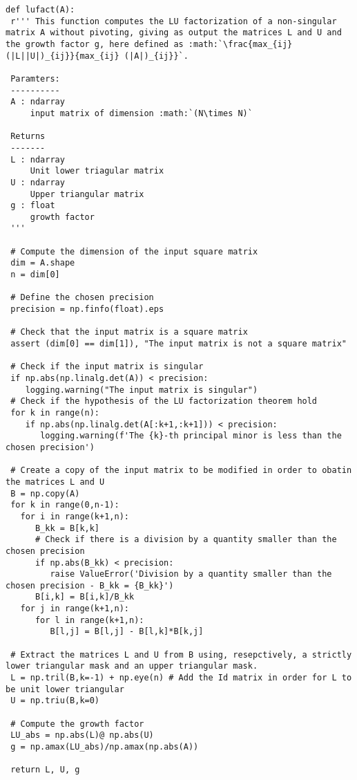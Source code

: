 \documentclass[a4paper,11pt]{report}
\begin{document}
\begin{verbatim}
def lufact(A):
 r''' This function computes the LU factorization of a non-singular matrix A without pivoting, giving as output the matrices L and U and the growth factor g, here defined as :math:`\frac{max_{ij} (|L||U|)_{ij}}{max_{ij} (|A|)_{ij}}`.

 Paramters:
 ----------
 A : ndarray
     input matrix of dimension :math:`(N\times N)`
	
 Returns
 -------
 L : ndarray
     Unit lower triagular matrix
 U : ndarray
     Upper triangular matrix
 g : float
     growth factor
 '''

 # Compute the dimension of the input square matrix
 dim = A.shape
 n = dim[0]

 # Define the chosen precision
 precision = np.finfo(float).eps

 # Check that the input matrix is a square matrix
 assert (dim[0] == dim[1]), "The input matrix is not a square matrix"

 # Check if the input matrix is singular
 if np.abs(np.linalg.det(A)) < precision:
    logging.warning("The input matrix is singular")
 # Check if the hypothesis of the LU factorization theorem hold
 for k in range(n):
    if np.abs(np.linalg.det(A[:k+1,:k+1])) < precision:
       logging.warning(f'The {k}-th principal minor is less than the chosen precision')

 # Create a copy of the input matrix to be modified in order to obatin the matrices L and U
 B = np.copy(A)
 for k in range(0,n-1):
   for i in range(k+1,n):
      B_kk = B[k,k]
      # Check if there is a division by a quantity smaller than the chosen precision
      if np.abs(B_kk) < precision:
         raise ValueError('Division by a quantity smaller than the chosen precision - B_kk = {B_kk}')
      B[i,k] = B[i,k]/B_kk
   for j in range(k+1,n):
      for l in range(k+1,n):
         B[l,j] = B[l,j] - B[l,k]*B[k,j]

 # Extract the matrices L and U from B using, resepctively, a strictly lower triangular mask and an upper triangular mask.
 L = np.tril(B,k=-1) + np.eye(n) # Add the Id matrix in order for L to be unit lower triangular
 U = np.triu(B,k=0)  

 # Compute the growth factor
 LU_abs = np.abs(L)@ np.abs(U)
 g = np.amax(LU_abs)/np.amax(np.abs(A))

 return L, U, g
\end{verbatim}
\end{document}
